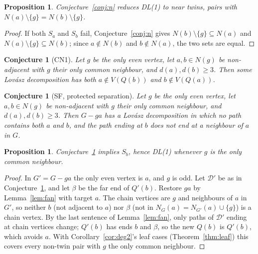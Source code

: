 \documentclass[11pt]{amsart}
\newtheorem{proposition}[theorem]{Proposition}
\newtheorem{conjecture}[theorem]{Conjecture}
\theoremstyle{definition}
\newcommand{\cD}{\mathcal D}
\begin{document}
\begin{proposition}\label{prop:nreduces}
Conjecture~\ref{conj:n} reduces DL(1) to \emph{near twins}, pairs with $N(a)\setminus\{g\}=N(b)\setminus\{g\}$.
\end{proposition}

\begin{proof}
If both $S_a$ and $S_b$ fail, Conjecture~\ref{conj:n} gives $N(b)\setminus\{g\}\subseteq N(a)$ and
$N(a)\setminus\{g\}\subseteq N(b)$; since $a\notin N(b)$ and $b\notin N(a)$, the two sets are equal.
\end{proof}

\begin{conjecture}[CN1]\label{conj:cn1}
Let $g$ be the only even vertex, let $a,b\in N(g)$ be non-adjacent with $g$ their only common
neighbour, and $d(a),d(b)\ge3$. Then some Lov\'asz decomposition has both $a\notin V(Q(b))$ and $b\notin V(Q(a))$.
\end{conjecture}

\begin{conjecture}[SF, protected separation]\label{conj:sf}
Let $g$ be the only even vertex, let $a,b\in N(g)$ be non-adjacent with $g$ their only common
neighbour, and $d(a),d(b)\ge3$. Then $G-ga$ has a
Lov\'asz decomposition in which no path contains both $a$ and $b$, and the path ending at $b$ does
not end at a neighbour of $a$ in $G$.
\end{conjecture}

\begin{proposition}\label{prop:sf}
Conjecture~\ref{conj:sf} implies $S_b$, hence DL(1) whenever $g$ is the only common neighbour.
\end{proposition}

\begin{proof}
In $G'=G-ga$ the only even vertex is $a$, and $g$ is odd. Let $\cD'$ be as in
Conjecture~\ref{conj:sf}, and let $\beta$ be the far end of $Q'(b)$. Restore $ga$ by
Lemma~\ref{lem:fan} with target $a$. The chain vertices are $g$ and neighbours of $a$ in $G'$, so
neither $b$ (not adjacent to $a$) nor $\beta$ (not in $N_G(a)=N_{G'}(a)\cup\{g\}$) is a chain vertex.
By the last sentence of Lemma~\ref{lem:fan}, only paths of $\cD'$ ending at chain vertices change;
$Q'(b)$ has ends $b$ and $\beta$, so the new $Q(b)$ is $Q'(b)$, which avoids $a$. With Corollary~\ref{cor:deg2}'s leaf
cases (Theorem~\ref{thm:leaf}) this covers every non-twin pair with $g$ the only common neighbour.
\end{proof}
\end{document}
